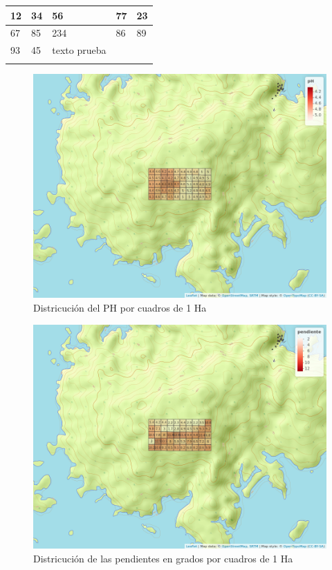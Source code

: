 \documentclass[11pt,]{article}
\begin{document}
\begin{longtable}[]{@{}lllll@{}}
\toprule
12 & 34 & 56 & 77 & 23\tabularnewline
\midrule
\endhead
67 & 85 & 234 & 86 & 89\tabularnewline
93 & 45 & texto prueba & &\tabularnewline
& & & &\tabularnewline
\bottomrule
\end{longtable}

\begin{figure}
\centering
\includegraphics{mapa_cuadros_ph.png}
\caption{Districución del PH por cuadros de 1 Ha}
\end{figure}

\begin{figure}
\centering
\includegraphics{mapa_cuadros_pendiente.png}
\caption{Districución de las pendientes en grados por cuadros de 1
Ha\label{fig:mapa_cuadros_pendiente}}
\end{figure}
\end{document}
